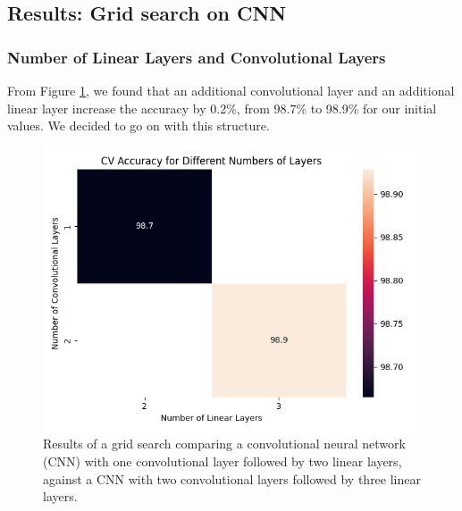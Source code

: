 \newpage
\subsection{Results: Grid search on CNN}
\subsubsection{Number of Linear Layers and Convolutional Layers}
From Figure \ref{fig:cnn:layers}, we found that an additional convolutional layer and an additional linear layer increase the accuracy by 0.2\%, from 98.7\% to 98.9\% for our initial values. We decided to go on with this structure.
\begin{figure}[H]
    \centering
    \includegraphics[width=\textwidth]{results/cnn_grid_search/heatmap_grid_search_layers.png}
    \caption{Results of a grid search comparing a convolutional neural network (CNN) with one convolutional layer followed by two linear layers, against a CNN with two convolutional layers followed by three linear layers.}
    \label{fig:cnn:layers}
\end{figure}

\newpage
